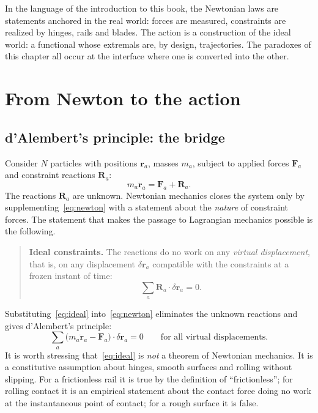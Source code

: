 In the language of the introduction to this book, the Newtonian laws are
statements anchored in the real world: forces are measured, constraints are
realized by hinges, rails and blades. The action is a construction of the ideal
world: a functional whose extremals are, by design, trajectories. The
paradoxes of this chapter all occur at the interface where one is converted
into the other.

\section{From Newton to the action}
\label{sec:newton-to-action}

\subsection{d'Alembert's principle: the bridge}

Consider $N$ particles with positions $\mathbf r_a$, masses $m_a$, subject to
applied forces $\mathbf F_a$ and constraint reactions $\mathbf R_a$:
\begin{equation}
  m_a\ddot{\mathbf r}_a=\mathbf F_a+\mathbf R_a .
  \label{eq:newton}
\end{equation}
The reactions $\mathbf R_a$ are unknown. Newtonian mechanics closes the system
only by supplementing~\eqref{eq:newton} with a statement about the
\emph{nature} of constraint forces. The statement that makes the passage to
Lagrangian mechanics possible is the following.

\begin{quote}
\textbf{Ideal constraints.} The reactions do no work on any \emph{virtual
displacement}, that is, on any displacement $\delta\mathbf r_a$ compatible with
the constraints at a frozen instant of time:
\begin{equation}
  \sum_a \mathbf R_a\cdot\delta\mathbf r_a = 0 .
  \label{eq:ideal}
\end{equation}
\end{quote}

Substituting~\eqref{eq:ideal} into~\eqref{eq:newton} eliminates the unknown
reactions and gives d'Alembert's principle:
\begin{equation}
  \sum_a\bigl(m_a\ddot{\mathbf r}_a-\mathbf F_a\bigr)\cdot\delta\mathbf r_a=0
  \qquad\text{for all virtual displacements.}
  \label{eq:dalembert}
\end{equation}
It is worth stressing that~\eqref{eq:ideal} is \emph{not} a theorem of
Newtonian mechanics. It is a constitutive assumption about hinges, smooth
surfaces and rolling without slipping. For a frictionless rail it is true by
the definition of ``frictionless''; for rolling contact it is an empirical
statement about the contact force doing no work at the instantaneous point of
contact; for a rough surface it is false.


